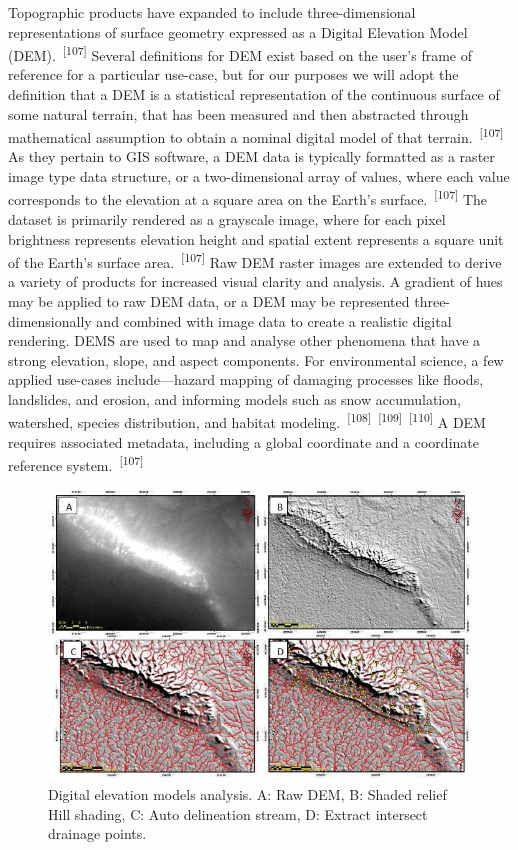 \documentclass{article}
\begin{document}
\par{Topographic products have expanded to include three-dimensional representations of surface geometry expressed as a Digital Elevation Model (DEM).~\textsuperscript{[107]} Several definitions for DEM exist based on the user's frame of reference for a particular use-case, but for our purposes we will adopt the definition that a DEM is a statistical representation of the continuous surface of some natural terrain, that has been measured and then abstracted through mathematical assumption to obtain a nominal digital model of that terrain.~\textsuperscript{[107]} As they pertain to GIS software, a DEM data is typically formatted as a raster image type data structure, or a two-dimensional array of values, where each value corresponds to the elevation at a square area on the Earth's surface.~\textsuperscript{[107]} The dataset is primarily rendered as a grayscale image, where for each pixel brightness represents elevation height and spatial extent represents a square unit of the Earth's surface area.~\textsuperscript{[107]} Raw DEM raster images are extended to derive a variety of products for increased visual clarity and analysis. A gradient of hues may be applied to raw DEM data, or a DEM may be represented three-dimensionally and combined with image data to create a realistic digital rendering. DEMS are used to map and analyse other phenomena that have a strong elevation, slope, and aspect components. For environmental science, a few applied use-cases include---hazard mapping of damaging processes like floods, landslides, and erosion, and informing models such as snow accumulation, watershed, species distribution, and habitat modeling.~\textsuperscript{[108]}~\textsuperscript{[109]}~\textsuperscript{[110]} A DEM requires associated metadata, including a global coordinate and a coordinate reference system.~\textsuperscript{[107]} }


\begin{figure}
    \centering
    \includegraphics[width=1.0\linewidth]{images/dem-examples.png}
    \caption{Digital elevation models analysis. A: Raw DEM, B: Shaded relief Hill shading, C: Auto delineation stream, D: Extract intersect drainage points.}
    \label{figure30}
\end{figure}
\end{document}
